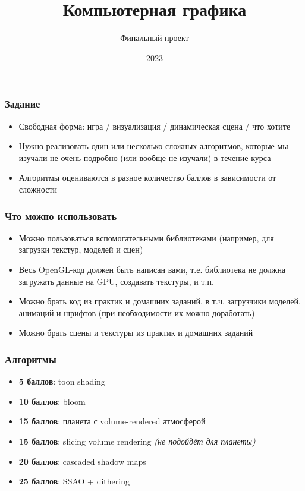 \documentclass{beamer}
\title{Компьютерная графика}
\subtitle{Финальный проект}
\date{2023}
\begin{document}
\frame{\titlepage}

\begin{frame}[fragile]
\frametitle{Задание}
\begin{itemize}
\item Свободная форма: игра / визуализация / динамическая сцена / что хотите
\pause
\item Нужно реализовать один или несколько сложных алгоритмов, которые мы изучали не очень подробно (или вообще не изучали) в течение курса
\pause
\item Алгоритмы оцениваются в разное количество баллов в зависимости от сложности
\end{itemize}
\end{frame}

\begin{frame}[fragile]
\frametitle{Что можно использовать}
\begin{itemize}
\item Можно пользоваться вспомогательными библиотеками (например, для загрузки текстур, моделей и сцен)
\pause
\item Весь OpenGL-код должен быть написан вами, т.е. библиотека не должна загружать данные на GPU, создавать текстуры, и т.п.
\pause
\item Можно брать код из практик и домашних заданий, в т.ч. загрузчики моделей, анимаций и шрифтов (при необходимости их можно доработать)
\pause
\item Можно брать сцены и текстуры из практик и домашних заданий
\end{itemize}
\end{frame}

\begin{frame}[fragile]
\frametitle{Алгоритмы}
\begin{itemize}
\item \textbf{5 баллов}: toon shading
\item \textbf{10 баллов}: bloom
\item \textbf{15 баллов}: планета с volume-rendered атмосферой
\item \textbf{15 баллов}: slicing volume rendering \textit{(не подойдёт для планеты)}
\item \textbf{20 баллов}: cascaded shadow maps
\item \textbf{25 баллов}: SSAO + dithering
\end{itemize}
\end{frame}
\end{document}
